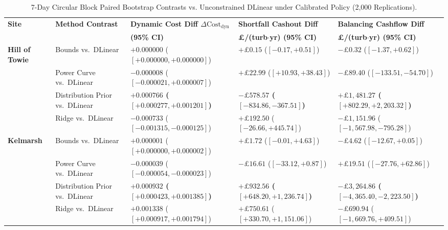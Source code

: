 \begin{table}[!t]
\centering
\vspace{-6pt}
\footnotesize
\renewcommand{\arraystretch}{0.80}
\setlength{\tabcolsep}{3.0pt}
\caption{7-Day Circular Block Paired Bootstrap Contrasts vs. Unconstrained DLinear under Calibrated Policy (2,000 Replications).}
\label{tab:paired_bootstrap}
\begin{threeparttable}
\begin{tabularx}{\textwidth}{p{2.2cm}p{3.2cm}>{\centering\arraybackslash}X>{\centering\arraybackslash}X>{\centering\arraybackslash}X}
\toprule
\textbf{Site} & \textbf{Method Contrast} & \textbf{Dynamic Cost Diff $\Delta \text{Cost}_{\text{dyn}}$} & \textbf{Shortfall Cashout Diff} & \textbf{Balancing Cashflow Diff} \\
 & & \textbf{(95\% CI)} & \textbf{\pounds/(turb$\cdot$yr) (95\% CI)} & \textbf{\pounds/(turb$\cdot$yr) (95\% CI)} \\
\midrule
\multirow{4}{=}{\textbf{Hill of Towie}} 
& Bounds vs.\ DLinear & $+0.000000$ ($[+0.000000, +0.000000]$) & $+\pounds 0.15$ ($[-0.17, +0.51]$) & $-\pounds 0.32$ ($[-1.37, +0.62]$) \\
& Power Curve vs.\ DLinear & $-0.000008$ ($[-0.000021, +0.000007]$) & $+\pounds 22.99$ ($[+10.93, +38.43]$) & $-\pounds 89.40$ ($[-133.51, -54.70]$) \\
& Distribution Prior vs.\ DLinear & \textbf{$+0.000766$ ($[+0.000277, +0.001201]$)} & \textbf{$-\pounds 578.57$ ($[-834.86, -367.51]$)} & \textbf{$+\pounds 1,481.27$ ($[+802.29, +2,203.32]$)} \\
& Ridge vs.\ DLinear & $-0.000733$ ($[-0.001315, -0.000125]$) & $+\pounds 192.50$ ($[-26.66, +445.74]$) & $-\pounds 1,151.96$ ($[-1,567.98, -795.28]$) \\
\midrule
\multirow{4}{=}{\textbf{Kelmarsh}} 
& Bounds vs.\ DLinear & $+0.000001$ ($[+0.000000, +0.000002]$) & $+\pounds 1.72$ ($[-0.01, +4.63]$) & $-\pounds 4.62$ ($[-12.67, +0.05]$) \\
& Power Curve vs.\ DLinear & $-0.000039$ ($[-0.000054, -0.000023]$) & $-\pounds 16.61$ ($[-33.12, +0.87]$) & $+\pounds 19.51$ ($[-27.76, +62.86]$) \\
& Distribution Prior vs.\ DLinear & \textbf{$+0.000932$ ($[+0.000423, +0.001385]$)} & \textbf{$+\pounds 932.56$ ($[+648.20, +1,236.74]$)} & \textbf{$-\pounds 3,264.86$ ($[-4,365.40, -2,223.50]$)} \\
& Ridge vs.\ DLinear & $+0.001338$ ($[+0.000917, +0.001794]$) & $+\pounds 750.61$ ($[+330.70, +1,151.06]$) & $-\pounds 690.94$ ($[-1,669.76, +409.51]$) \\

\end{tabularx}
\end{threeparttable}
\end{table}
